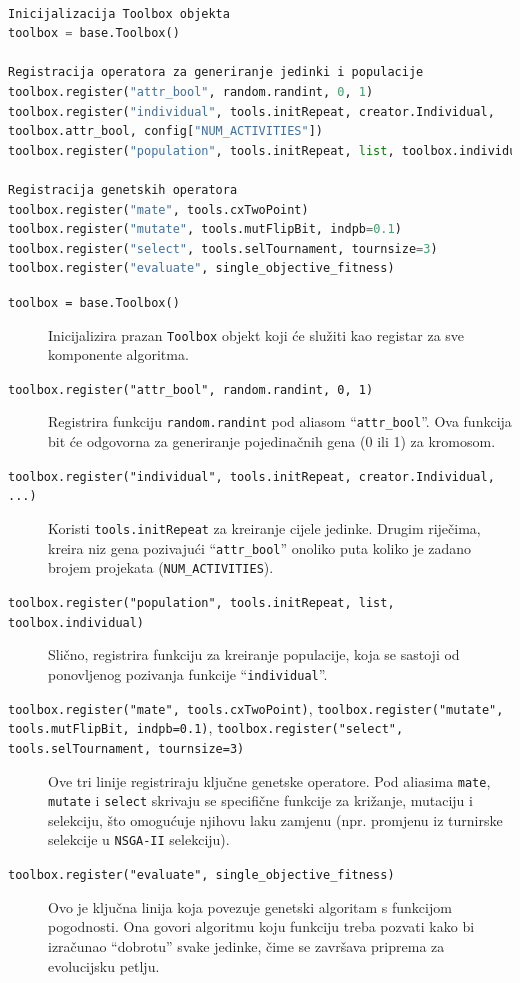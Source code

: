 \begin{lstlisting}[float, language=Python, caption={Primjer konfiguracije DEAP Toolbox-a za genetske operatore.}, label={lst:toolbox}, captionpos=b]

Inicijalizacija Toolbox objekta
toolbox = base.Toolbox()

Registracija operatora za generiranje jedinki i populacije
toolbox.register("attr_bool", random.randint, 0, 1)
toolbox.register("individual", tools.initRepeat, creator.Individual,
toolbox.attr_bool, config["NUM_ACTIVITIES"])
toolbox.register("population", tools.initRepeat, list, toolbox.individual)

Registracija genetskih operatora
toolbox.register("mate", tools.cxTwoPoint)
toolbox.register("mutate", tools.mutFlipBit, indpb=0.1)
toolbox.register("select", tools.selTournament, tournsize=3)
toolbox.register("evaluate", single_objective_fitness)
\end{lstlisting}

\begin{description}
    \item[\texttt{toolbox = base.Toolbox()}] Inicijalizira prazan \texttt{Toolbox} objekt koji će služiti kao registar za sve komponente algoritma.
    \item[\texttt{toolbox.register("attr\_bool", random.randint, 0, 1)}] Registrira funkciju \texttt{random.randint} pod aliasom ``\texttt{attr\_bool}''. Ova funkcija bit će odgovorna za generiranje pojedinačnih gena (0 ili 1) za kromosom.
    \item[\texttt{toolbox.register("individual", tools.initRepeat, creator.Individual, ...)}] Koristi \texttt{tools.initRepeat} za kreiranje cijele jedinke. Drugim riječima, kreira niz gena pozivajući ``\texttt{attr\_bool}'' onoliko puta koliko je zadano brojem projekata (\texttt{NUM\_ACTIVITIES}).
    \item[\texttt{toolbox.register("population", tools.initRepeat, list, toolbox.individual)}] Slično, registrira funkciju za kreiranje populacije, koja se sastoji od ponovljenog pozivanja funkcije ``\texttt{individual}''.
    \item[\texttt{toolbox.register("mate", tools.cxTwoPoint)}, \texttt{toolbox.register("mutate", tools.mutFlipBit, indpb=0.1)}, \texttt{toolbox.register("select", tools.selTournament, tournsize=3)}] Ove tri linije registriraju ključne genetske operatore. Pod aliasima \texttt{mate}, \texttt{mutate} i \texttt{select} skrivaju se specifične funkcije za križanje, mutaciju i selekciju, što omogućuje njihovu laku zamjenu (npr. promjenu iz turnirske selekcije u \texttt{NSGA-II} selekciju).
    \item[\texttt{toolbox.register("evaluate", single\_objective\_fitness)}] Ovo je ključna linija koja povezuje genetski algoritam s funkcijom pogodnosti. Ona govori algoritmu koju funkciju treba pozvati kako bi izračunao ``dobrotu'' svake jedinke, čime se završava priprema za evolucijsku petlju.
\end{description}

